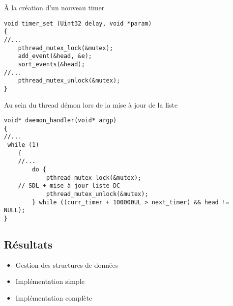 \documentclass[a4paper]{article}
\newcommand{\cmark}{\ding{51}}%
\newcommand{\xmark}{\ding{55}}%
\newcommand{\done}{\rlap{$\square$}{\raisebox{2pt}{\large\hspace{1pt}\cmark}}%
\hspace{-2.5pt}}
\newcommand{\wontfix}{\rlap{$\square$}{\large\hspace{1pt}\xmark}}
\begin{document}
À la création d'un nouveau timer
\begin{verbatim}
void timer_set (Uint32 delay, void *param)
{
//...
    pthread_mutex_lock(&mutex);
    add_event(&head, &e);
    sort_events(&head);
//...
    pthread_mutex_unlock(&mutex);
}
\end{verbatim}

Au sein du thread démon lors de la mise à jour de la liste
\begin{verbatim}
void* daemon_handler(void* argp)
{
//...
 while (1)
    {
	//...
        do {
            pthread_mutex_lock(&mutex);
	// SDL + mise à jour liste DC
            pthread_mutex_unlock(&mutex);
        } while ((curr_timer + 100000UL > next_timer) && head != NULL);
}
\end{verbatim}

\subsection{Résultats}

\begin{itemize}
  \item Gestion des structures de données
  
  \item Implémentation simple
  
  \item Implémentation complète
\end{itemize}
\end{document}
